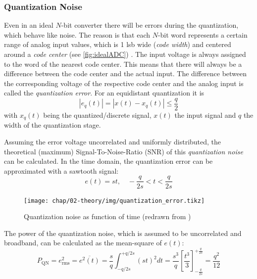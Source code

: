 
\subsubsection{Quantization Noise}
Even in an ideal $N$-bit converter there will be errors during the quantization, which behave like noise.
The reason is that each $N$-bit word represents a certain range of analog input values, which is 1 \gls{lsb} wide (\textit{code width}) and centered around a \textit{code center} (see \autoref{fig:idealADC}) \cite{Lundberg}.
The input voltage is always assigned to the word of the nearest code center. %
This means that there will always be a difference between the code center and the actual input.
The difference between the corresponding voltage of the respective code center and the analog input is called the \textit{quantization error}.
For an equidistant quantization it is
\begin{equation}
\left| e_q(t) \right| = \left| x(t) - x_q(t) \right| \leq \frac{q}{2}
\end{equation}
with $x_q(t)$ being the quantized/discrete signal, $x(t)$ the input signal and $q$ the width of the quantization stage. \cite{puente2015}

Assuming the error voltage uncorrelated and uniformly distributed, the theoretical (maximum) Signal-To-Noise-Ratio (SNR) of this \textit{quantization noise} can be calculated. In the time domain, the quantization error can be approximated with a sawtooth signal:
\begin{equation}
e(t) = st, \quad -\frac{q}{2s} < t < \frac{q}{2s} 
\end{equation}

\begin{figure}[tbh]
	\centering
	\texttt{[image: chap/02-theory/img/quantization\_error.tikz]}
	\caption{Quantization noise as function of time (redrawn from \cite{walt})}
	\label{fig:eq}
\end{figure}


The power of the quantization noise, which is assumed to be uncorrelated and broadband, can be calculated as the mean-square of $e(t)$:
\begin{equation}
P_\text{QN} = e_{\text{rms}}^{2} = \overline{e^{2}(t)} = \frac{s}{q}\int_{-q/2s}^{+q/2s} (st)^{2} dt = \frac{s^3}{q} \left[ \frac{t^3}{3}\right]_{-\frac{q}{2s}}^{+\frac{q}{2s}} = \frac{q^2}{12}
\end{equation}

